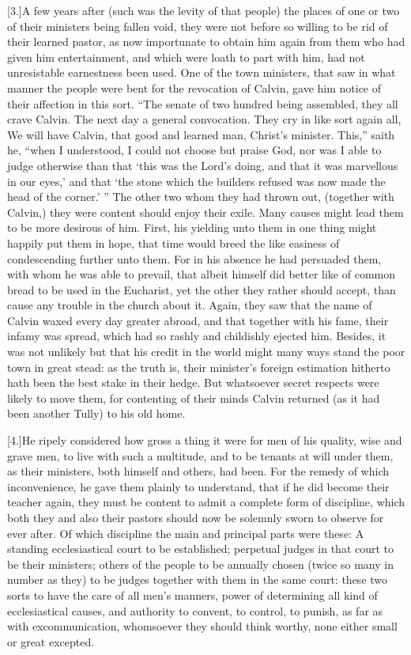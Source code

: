 [3.]A few years after (such was the levity of that people) the places of one or two of their ministers being fallen void, they were not before so willing to be rid of their learned pastor, as now importunate to obtain him again from them who had given him entertainment, and which were loath to part with him, had not unresistable earnestness been used. One of the town ministers, that saw in what manner the people were bent for the revocation of Calvin, gave him notice of their affection in this sort. “The senate of two hundred being assembled, they all crave Calvin. The next day a general convocation. They cry in like sort again all, We will have Calvin, that good and learned man, Christ’s minister. This,” saith he, “when I understood, I could not choose but praise God, nor was I able to judge otherwise than that ‘this was the Lord’s doing, and that it was marvellous in our eyes,’ and that ‘the stone which the builders refused was now made the head of the corner.’ ” The other two whom they had thrown out, (together with Calvin,) they were content should enjoy their exile. Many causes might lead them to be more desirous of him. First, his yielding unto them in one thing might happily put them in hope, that time would breed the like easiness of condescending further unto them. For in his absence he had persuaded them, with whom he was able to prevail, that albeit himself did better like of common bread to be used in the Eucharist, yet the other they rather should accept, than cause any trouble in the church about it. Again, they saw that the name of Calvin waxed every day greater abroad, and that together with his fame, their infamy was spread, which had so rashly and childishly ejected him. Besides, it was not unlikely but that his credit in the world might many ways stand the poor town in great stead: as the truth is, their minister’s foreign estimation hitherto hath been the best stake in their hedge. But whatsoever secret respects were likely to move them, for contenting of their minds Calvin returned (as it had been another Tully) to his old home.

[4.]He ripely considered how gross a thing it were for men of his quality, wise and grave men, to live with such a multitude, and to be tenants at will under them, as their ministers, both himself and others, had been. For the remedy of which inconvenience, he gave them plainly to understand, that if he did become their teacher again, they must be content to admit a complete form of discipline, which both they and also their pastors should now be solemnly sworn to observe for ever after. Of which discipline the main and principal parts were these: A standing ecclesiastical court to be established; perpetual judges in that court to be their ministers; others of the people to be annually chosen (twice so many in number as they) to be judges together with them in the same court: these two sorts to have the care of all men’s manners, power of determining all kind of ecclesiastical causes, and authority to convent, to control, to punish, as far as with excommunication, whomsoever they should think worthy, none either small or great excepted.

